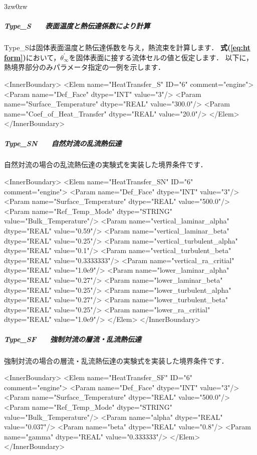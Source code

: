 \begin{indentation}{3zw}{0zw}
%
\subparagraph{Type\_S　　表面温度と熱伝達係数により計算}
Type\_Sは固体表面温度と熱伝達係数を与え，熱流束を計算します．
\textbf{式(\ref{eq:ht form})}において，$\theta_{\infty}^{\prime}$を固体表面に接する流体セルの値と仮定します．
以下に，熱境界部分のみパラメータ指定の一例を示します．

{\small
\begin{program}
<InnerBoundary>
  <Elem name="HeatTransfer_S" ID="6" comment="engine">
    <Param name="Def_Face"              dtype="INT"  value="3"/>
    <Param name="Surface_Temperature"   dtype="REAL" value="300.0"/>
    <Param name="Coef_of_Heat_Transfer" dtype="REAL" value="20.0"/>
  </Elem>
</InnerBoundary>
\end{program}
}

%
\subparagraph{Type\_SN　　自然対流の乱流熱伝達}
自然対流の場合の乱流熱伝達の実験式を実装した境界条件です．

{\small
\begin{program}
<InnerBoundary>
  <Elem name="HeatTransfer_SN" ID="6" comment="engine">
    <Param name="Def_Face"                 dtype="INT"    value="3"/>
    <Param name="Surface_Temperature"      dtype="REAL"   value="500.0"/>
    <Param name="Ref_Temp_Mode"            dtype="STRING" value="Bulk_Temperature"/>
    <Param name="vertical_laminar_alpha"   dtype="REAL"   value="0.59"/>
    <Param name="vertical_laminar_beta"    dtype="REAL"   value="0.25"/>
    <Param name="vertical_turbulent_alpha" dtype="REAL"   value="0.1"/>
    <Param name="vertical_turbulent_beta"  dtype="REAL"   value="0.3333333"/>
    <Param name="vertical_ra_critial"      dtype="REAL"   value="1.0e9"/>
    <Param name="lower_laminar_alpha"      dtype="REAL"   value="0.27"/>
    <Param name="lower_laminar_beta"       dtype="REAL"   value="0.25"/>
    <Param name="lower_turbulent_alpha"    dtype="REAL"   value="0.27"/>
    <Param name="lower_turbulent_beta"     dtype="REAL"   value="0.25"/>
    <Param name="lower_ra_critial"         dtype="REAL"   value="1.0e9"/>
  </Elem>
</InnerBoundary>
\end{program}
}

%
\subparagraph{Type\_SF　　強制対流の層流・乱流熱伝達}
強制対流の場合の層流・乱流熱伝達の実験式を実装した境界条件です．

{\small
\begin{program}
<InnerBoundary>
  <Elem name="HeatTransfer_SF" ID="6" comment="engine">
    <Param name="Def_Face"            dtype="INT"    value="3"/>
    <Param name="Surface_Temperature" dtype="REAL"   value="500.0"/>
    <Param name="Ref_Temp_Mode"       dtype="STRING" value="Bulk_Temperature"/>
    <Param name="alpha"               dtype="REAL"   value="0.037"/>
    <Param name="beta"                dtype="REAL"   value="0.8"/>
    <Param name="gamma"               dtype="REAL"   value="0.333333"/>
  </Elem>
</InnerBoundary>
\end{program}
}


\end{indentation}
